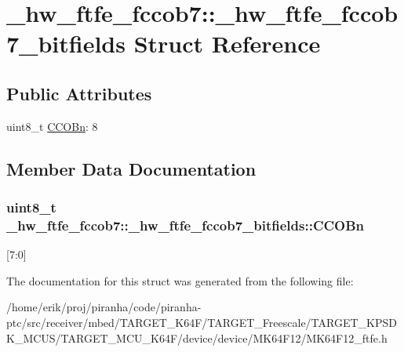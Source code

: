 \hypertarget{struct__hw__ftfe__fccob7_1_1__hw__ftfe__fccob7__bitfields}{}\section{\+\_\+hw\+\_\+ftfe\+\_\+fccob7\+:\+:\+\_\+hw\+\_\+ftfe\+\_\+fccob7\+\_\+bitfields Struct Reference}
\label{struct__hw__ftfe__fccob7_1_1__hw__ftfe__fccob7__bitfields}
\subsection*{Public Attributes}
\begin{DoxyCompactItemize}
\item 
uint8\+\_\+t \hyperlink{struct__hw__ftfe__fccob7_1_1__hw__ftfe__fccob7__bitfields_a90ec442ea4d7a3a847d4df9c8bc2ea77}{C\+C\+O\+Bn}\+: 8
\end{DoxyCompactItemize}


\subsection{Member Data Documentation}
\subsubsection[{\texorpdfstring{C\+C\+O\+Bn}{CCOBn}}]{\setlength{\rightskip}{0pt plus 5cm}uint8\+\_\+t \+\_\+hw\+\_\+ftfe\+\_\+fccob7\+::\+\_\+hw\+\_\+ftfe\+\_\+fccob7\+\_\+bitfields\+::\+C\+C\+O\+Bn}\hypertarget{struct__hw__ftfe__fccob7_1_1__hw__ftfe__fccob7__bitfields_a90ec442ea4d7a3a847d4df9c8bc2ea77}{}\label{struct__hw__ftfe__fccob7_1_1__hw__ftfe__fccob7__bitfields_a90ec442ea4d7a3a847d4df9c8bc2ea77}
\mbox{[}7\+:0\mbox{]} 

The documentation for this struct was generated from the following file\+:\begin{DoxyCompactItemize}
\item 
/home/erik/proj/piranha/code/piranha-\/ptc/src/receiver/mbed/\+T\+A\+R\+G\+E\+T\+\_\+\+K64\+F/\+T\+A\+R\+G\+E\+T\+\_\+\+Freescale/\+T\+A\+R\+G\+E\+T\+\_\+\+K\+P\+S\+D\+K\+\_\+\+M\+C\+U\+S/\+T\+A\+R\+G\+E\+T\+\_\+\+M\+C\+U\+\_\+\+K64\+F/device/device/\+M\+K64\+F12/M\+K64\+F12\+\_\+ftfe.\+h\end{DoxyCompactItemize}
